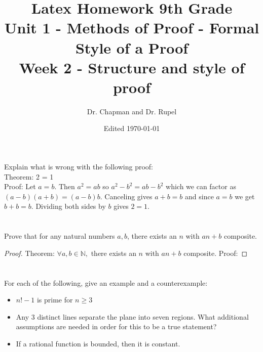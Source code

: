 \documentclass{amsart}
\title{Latex Homework 9th Grade\\ Unit 1 - Methods of Proof - Formal Style of a Proof\\ Week 2 - Structure and style of proof}
\author{Dr. Chapman and Dr. Rupel}
\date{Edited \today}
\begin{document}
\maketitle

\section{}
    Explain what is wrong with the following proof:\\ Theorem: 2 = 1\\Proof: Let \(a = b\). Then \(a^2 = ab\) so \(a^2-b^2 = ab - b^2\) which we can factor as \((a-b)(a+b) = (a-b)b\). Canceling gives \(a+b = b\) and since \(a = b\) we get \(b+b = b\). Dividing both sides by \(b\) gives \(2 = 1\).

\section{}
    Prove that for any natural numbers \(a,b\), there exists an \(n\) with \(an+b\) composite.
	\begin{proof}
	Theorem: $\forall a,b\in\mathbb{N},$ there exists an $n$ with $an+b$ composite.
	Proof: 
	\end{proof}
    
\section{}
    For each of the following, give an example and a counterexample:
    \begin{itemize}
        \item \(n!-1\) is prime for \(n \geq 3\)
        \item Any 3 distinct lines separate the plane into seven regions.  What additional assumptions are needed in order for this to be a true statement?
        \item If a rational function is bounded, then it is constant.
    \end{itemize}
    
\end{document}
